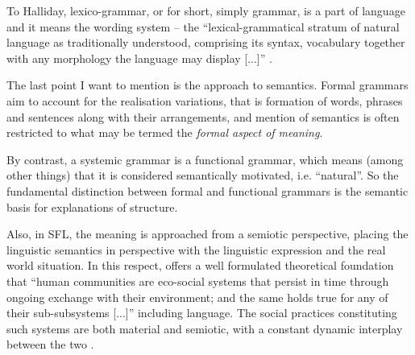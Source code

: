 
\begin{definition}\label{def:grammar-halliday}
	To Halliday, lexico-grammar, or for short, simply grammar, is a part of language and it means the wording system -- the ``lexical-grammatical stratum of natural language as traditionally understood, comprising its syntax, vocabulary together with any morphology the language may display [...]'' \citep[369]{Halliday2002}.
\end{definition}


The last point I want to mention is the approach to semantics. Formal grammars aim to account for the realisation variations, that is formation of words, phrases and sentences along with their arrangements, and mention of semantics is often restricted to what may be termed the \textit{formal aspect of meaning}. 

By contrast, a systemic grammar is a functional grammar, which means (among other things) that it is considered semantically motivated, i.e. ``natural''. 
So the fundamental distinction between formal and functional grammars is the semantic basis for explanations of structure. 

Also, in SFL, the meaning is approached from a semiotic perspective, placing the linguistic semantics in perspective with the linguistic expression and the real world situation. 
In this respect, \citet{Lemke93} offers a well formulated theoretical foundation that ``human communities are eco-social systems that persist in time through ongoing exchange with their environment; and the same holds true for any of their sub-subsystems [...]'' including language. The social practices constituting such systems are both material and semiotic, with a constant dynamic interplay between the two \citep[387]{Halliday2002}.

